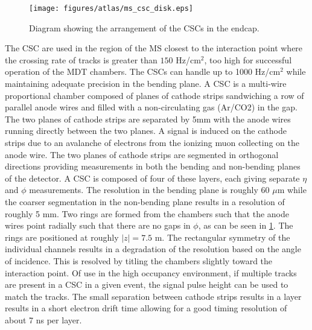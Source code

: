 \begin{figure}[ht]
\centering
\texttt{[image: figures/atlas/ms\_csc\_disk.eps]}
\caption{Diagram showing the arrangement of the CSCs in the endcap.}
\label{fig:atlas_ms_csc_disk}
\end{figure}


The CSC are used in the region of the MS closest to the interaction
point where the crossing rate of tracks 
is greater than $150$ Hz/cm$^2$, 
too high for successful operation of the MDT chambers.
The CSCs can handle up to 1000 Hz/cm$^2$
while maintaining adequate  precision in the bending plane.
A CSC is a multi-wire proportional chamber
composed of planes of cathode strips sandwiching 
a row of parallel anode wires and filled with a non-circulating gas (Ar/CO2)
in the gap.
The two planes of cathode strips are separated by 5mm
with the anode wires running directly between the two planes.
A signal is induced on the cathode strips due to an avalanche
of electrons from the ionizing muon collecting on the anode wire.
The two planes of cathode strips are segmented in orthogonal directions
providing measurements in both the bending and non-bending planes of the detector. 
A CSC is composed of four of these layers, each giving separate $\eta$ and
$\phi$ measurements.
The resolution in the bending plane is roughly 60 $\mu$m
while the coarser segmentation in the non-bending plane 
results in a  resolution of  roughly 5 mm.
Two rings are formed from the chambers such that the anode wires
point radially such that there are no gaps in $\phi$, as
can be seen in \fig\ref{fig:atlas_ms_csc_disk}. The rings are positioned
at roughly $|z|=7.5$ m. The rectangular symmetry of the individual channels
results in a degradation of the resolution based on the angle of incidence.
This is resolved by titling the chambers slightly toward the interaction point.
Of use in the high occupancy environment, 
if multiple tracks are present in a CSC in a given event, 
the signal pulse height can be used to match the tracks.
The small separation between cathode strips results in a layer
results in a short electron drift time allowing for a good
timing resolution of about 7 ns per layer.

